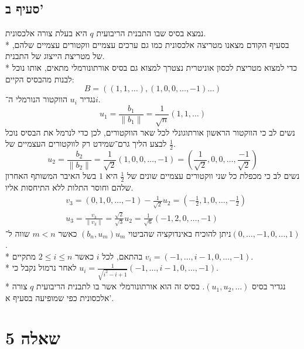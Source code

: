 \subsection{סעיף ב'}
נמצא בסיס שבו התבנית הריבועית $q$ היא בעלת צורה אלכסונית. \\*
בסעיף הקודם מצאנו מטריצה אלכסונית כמו גם ערכים עצמיים ווקטורים עצמיים שלהם, של מטריצת הייצוג של התבנית. \\*
כדי למצוא מטריצת לכסון אוניטרית נצטרך למצוא גם בסיס אורתונורמלי מתאים, אותו נוכל לבנות מהבסיס הקיים:
\[
	B = \left( (1, 1, \hdots), (1, 0, 0, \hdots, -1) \hdots \right)
\]
נגדיר $u_i$ הווקטור הנורמלי ה־$i$.
\[
	u_1 = \frac{b_1}{\lVert b_1 \rVert} = \frac{1}{\sqrt{n}} (1, 1, \hdots)
\]
נשים לב כי הווקטור הראשון אורתוגונלי לכל שאר הווקטורים, לכן כדי לנרמל את הבסיס נוכל לבצע הליך גרם־שמידט רק לווקטורים העצמיים של $\frac{1}{2}$.
\[
	u_2 = \frac{b_2}{\lVert b_2 \rVert} = \frac{1}{\sqrt{2}} \left(1, 0, 0, \hdots, -1\right)
	= \left(\frac{1}{\sqrt{2}}, 0, 0, \hdots, \frac{-1}{\sqrt{2}}\right)
\]
נשים לב כי מכפלת כל שני ווקטורים עצמיים שונים של $\frac{1}{2}$ היא $1$ בשל האיבר המשותף האחרון שלהם וחוסר התלות ללא התיחסות אליו.
\begin{align*}
	& v_3 = (0, 1, 0, \hdots, -1) - \frac{1}{\sqrt{2}} u_2 = (-\frac{1}{2}, 1, 0, \hdots, -\frac{1}{2}) \\
	& u_3 = \frac{v_3}{\lVert v_3 \rVert} = \frac{\sqrt{2}}{\sqrt{3}} u_2 = \frac{1}{\sqrt{6}} (-1, 2, 0, \hdots, -1)
\end{align*}
ניתן להוכיח באינדוקציה שהביטוי $(b_n, u_m) u_m$ כאשר $m < n$ שווה ל־$(0, \hdots, -1, 0, \hdots, 1)$. \\*
בהתאם, לכל $i$ כאשר $2 \le i \le n$ מתקיים $v_i = (-1, \hdots, i - 1, 0, \hdots, -1)$. \\*
לאחר נרמול נקבל כי $u_i = \frac{1}{\sqrt{i^2 - i + 1}} (-1, \hdots, i - 1, 0, \hdots, -1)$. \\*
נגדיר בסיס $(u_1, u_2, \hdots)$. בסיס זה הוא אורתונורמלי אשר בו לתבנית הריבועית $q$ צורה אלכסונית כפי שמופיעה בסעיף א'.

\section{שאלה 5}
